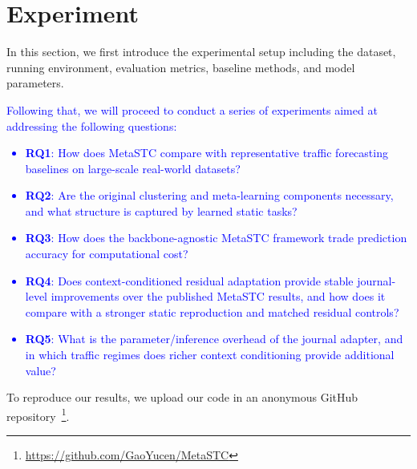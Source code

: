 \documentclass[lettersize,journal]{IEEEtran}
\begin{document}
\section{Experiment}
\label{sec:exp}
In this section, we first introduce the experimental setup including the dataset, running environment, evaluation metrics, baseline methods, and model parameters. \textcolor{blue}{Following that, we will proceed to conduct a series of experiments aimed at addressing the following questions:
\begin{itemize}
\item \textbf{RQ1}: How does MetaSTC compare with representative traffic forecasting baselines on large-scale real-world datasets?
\item \textbf{RQ2}: Are the original clustering and meta-learning components necessary, and what structure is captured by learned static tasks?
\item \textbf{RQ3}: How does the backbone-agnostic MetaSTC framework trade prediction accuracy for computational cost?
\item \textbf{RQ4}: Does context-conditioned residual adaptation provide stable journal-level improvements over the published MetaSTC results, and how does it compare with a stronger static reproduction and matched residual controls?
\item \textbf{RQ5}: What is the parameter/inference overhead of the journal adapter, and in which traffic regimes does richer context conditioning provide additional value?
\end{itemize}}

To reproduce our results, we upload our code in an anonymous GitHub repository~\footnote{\url{https://github.com/GaoYucen/MetaSTC}}.
\end{document}
